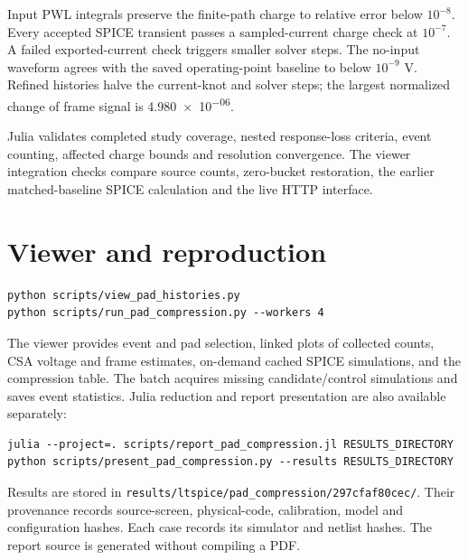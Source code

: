 \documentclass[11pt,a4paper]{article}
\begin{document}
Input PWL integrals preserve the finite-path charge to relative error below
$10^{-8}$. Every accepted SPICE transient passes a sampled-current charge check
at $10^{-7}$. A failed exported-current check triggers smaller solver steps.
The no-input waveform agrees with the saved operating-point baseline to below
$10^{-9}$ V. Refined histories halve the current-knot and solver steps; the
largest normalized change of frame signal is \num{4.980e-06}.

Julia validates completed study coverage, nested response-loss criteria, event
counting, affected charge bounds and resolution convergence. The viewer
integration checks compare source counts, zero-bucket restoration, the earlier
matched-baseline SPICE calculation and the live HTTP interface.

\section{Viewer and reproduction}
\begin{verbatim}
python scripts/view_pad_histories.py
python scripts/run_pad_compression.py --workers 4
\end{verbatim}
The viewer provides event and pad selection, linked plots of collected counts,
CSA voltage and frame estimates, on-demand cached SPICE simulations, and the
compression table. The batch acquires missing candidate/control simulations and
saves event statistics. Julia reduction and report presentation are also
available separately:
\begin{verbatim}
julia --project=. scripts/report_pad_compression.jl RESULTS_DIRECTORY
python scripts/present_pad_compression.py --results RESULTS_DIRECTORY
\end{verbatim}
Results are stored in \texttt{results/ltspice/pad\_compression/297cfaf80cec/}.
Their provenance records source-screen, physical-code, calibration, model and
configuration hashes. Each case records its simulator and netlist hashes.
The report source is generated without compiling a PDF.
\end{document}
